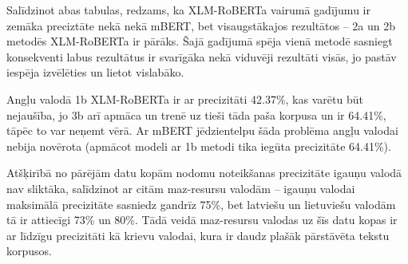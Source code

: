




Salīdzinot abas tabulas, redzams, ka XLM-RoBERTa vairumā gadījumu ir zemāka preciztāte nekā nekā mBERT, bet visaugstākajos rezultātos -- 2a un 2b metodēs XLM-RoBERTa ir pārāks. Šajā gadījumā spēja vienā metodē sasniegt konsekventi labus rezultātus ir svarīgāka nekā viduvēji rezultāti visās, jo pastāv iespēja izvēlēties un lietot vislabāko.

Angļu valodā 1b XLM-RoBERTa ir ar precizitāti 42.37\%, kas varētu būt nejaušība, jo 3b arī apmāca un trenē uz tieši tāda paša korpusa un ir 64.41\%, tāpēc to var neņemt vērā. Ar mBERT jēdzientelpu šāda problēma angļu valodai nebija novērota (apmācot modeli ar 1b metodi tika iegūta precizitāte 64.41\%).

Atšķirībā no pārējām datu kopām nodomu noteikšanas precizitāte igauņu valodā nav sliktāka, salīdzinot ar citām maz-resursu valodām -- igauņu valodai maksimālā precizitāte sasniedz gandrīz 75\%, bet latviešu un lietuviešu valodām tā ir attiecīgi 73\% un 80\%. Tādā veidā maz-resursu valodas uz šīs datu kopas ir ar līdzīgu precizitāti kā krievu valodai, kura ir daudz plašāk pārstāvēta tekstu korpusos.






